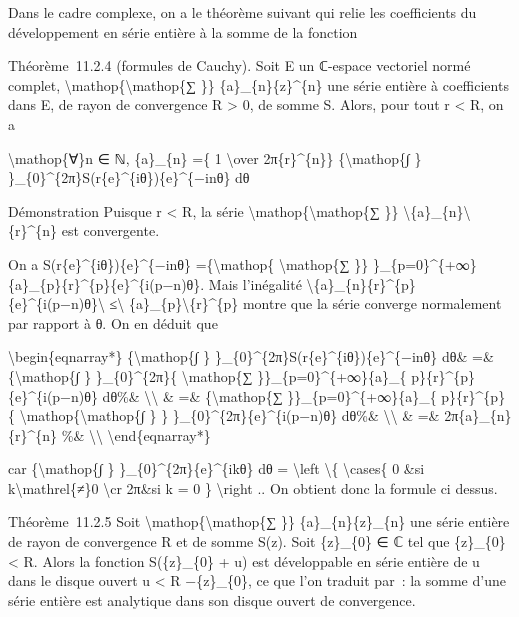\documentclass[]{article}
\begin{document}
Dans le cadre complexe, on a le théorème suivant qui relie les
coefficients du développement en série entière à la somme de la fonction

Théorème~11.2.4 (formules de Cauchy). Soit E un ℂ-espace vectoriel normé
complet, \textbackslash{}mathop\{\textbackslash{}mathop\{∑ \}\}
\{a\}\_\{n\}\{z\}\^{}\{n\} une série entière à coefficients dans E, de
rayon de convergence R \textgreater{} 0, de somme S. Alors, pour tout r
\textless{} R, on a

\textbackslash{}mathop\{∀\}n ∈ ℕ, \{a\}\_\{n\} =\{ 1
\textbackslash{}over 2π\{r\}\^{}\{n\}\} \{\textbackslash{}mathop\{∫ \}
\}\_\{0\}\^{}\{2π\}S(r\{e\}\^{}\{iθ\})\{e\}\^{}\{−inθ\} dθ

Démonstration Puisque r \textless{} R, la série
\textbackslash{}mathop\{\textbackslash{}mathop\{∑ \}\}
\textbackslash{}\textbar{}\{a\}\_\{n\}\textbackslash{}\textbar{}\{r\}\^{}\{n\}
est convergente.

On a S(r\{e\}\^{}\{iθ\})\{e\}\^{}\{−inθ\} =\{\textbackslash{}mathop\{
\textbackslash{}mathop\{∑ \}\}
\}\_\{p=0\}\^{}\{+∞\}\{a\}\_\{p\}\{r\}\^{}\{p\}\{e\}\^{}\{i(p−n)θ\}.
Mais l'inégalité
\textbackslash{}\textbar{}\{a\}\_\{n\}\{r\}\^{}\{p\}\{e\}\^{}\{i(p−n)θ\}\textbackslash{}\textbar{}
≤\textbackslash{}\textbar{}
\{a\}\_\{p\}\textbackslash{}\textbar{}\{r\}\^{}\{p\} montre que la série
converge normalement par rapport à θ. On en déduit que

\textbackslash{}begin\{eqnarray*\} \{\textbackslash{}mathop\{∫ \}
\}\_\{0\}\^{}\{2π\}S(r\{e\}\^{}\{iθ\})\{e\}\^{}\{−inθ\} dθ\& =\&
\{\textbackslash{}mathop\{∫ \} \}\_\{0\}\^{}\{2π\}\{
\textbackslash{}mathop\{∑ \}\}\_\{p=0\}\^{}\{+∞\}\{a\}\_\{
p\}\{r\}\^{}\{p\}\{e\}\^{}\{i(p−n)θ\} dθ\%\&
\textbackslash{}\textbackslash{} \& =\& \{\textbackslash{}mathop\{∑
\}\}\_\{p=0\}\^{}\{+∞\}\{a\}\_\{ p\}\{r\}\^{}\{p\}\{
\textbackslash{}mathop\{\textbackslash{}mathop\{∫ \} \}
\}\_\{0\}\^{}\{2π\}\{e\}\^{}\{i(p−n)θ\} dθ\%\&
\textbackslash{}\textbackslash{} \& =\& 2π\{a\}\_\{n\}\{r\}\^{}\{n\}
\%\& \textbackslash{}\textbackslash{} \textbackslash{}end\{eqnarray*\}

car \{\textbackslash{}mathop\{∫ \} \}\_\{0\}\^{}\{2π\}\{e\}\^{}\{ikθ\}
dθ = \textbackslash{}left \textbackslash{}\{ \textbackslash{}cases\{ 0
\&si k\textbackslash{}mathrel\{≠\}0 \textbackslash{}cr 2π\&si k = 0 \}
\textbackslash{}right .. On obtient donc la formule ci dessus.

Théorème~11.2.5 Soit \textbackslash{}mathop\{\textbackslash{}mathop\{∑
\}\} \{a\}\_\{n\}\{z\}\_\{n\} une série entière de rayon de convergence
R et de somme S(z). Soit \{z\}\_\{0\} ∈ ℂ tel que
\textbar{}\{z\}\_\{0\}\textbar{} \textless{} R. Alors la fonction
S(\{z\}\_\{0\} + u) est développable en série entière de u dans le
disque ouvert \textbar{}u\textbar{} \textless{} R
−\textbar{}\{z\}\_\{0\}\textbar{}, ce que l'on traduit par~: la somme
d'une série entière est analytique dans son disque ouvert de
convergence.
\end{document}

